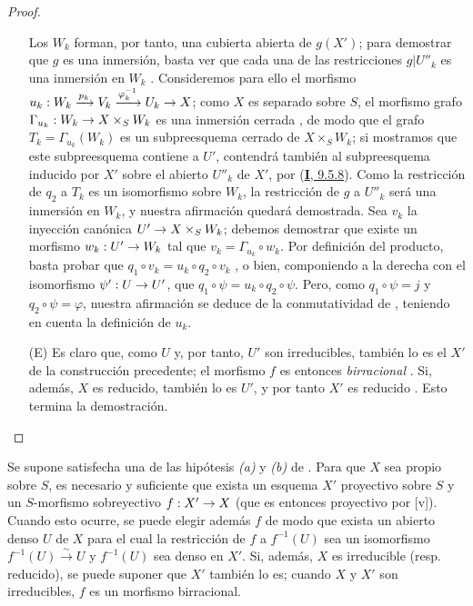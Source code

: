 \documentclass[oneside,10pt]{amsart}
\makeatletter
\newcommand{\ega@arrow}[2]{\mathchoice{#1}{#2}{#2}{#2}}
\renewcommand{\to}{\ega@arrow{\longrightarrow}{\rightarrow}}
\newcommand{\oldpage}[2][]{\marginnote{\normalfont\footnotesize\textbf{#1}~|~#2}\ignorespaces}
\let\EGAOriginalLabel\label
\renewcommand{\label}[1]{\phantomsection\EGAOriginalLabel{#1}}
\makeatother
\begin{document}
\begin{proof}
\begin{enumerate}
    Los $W_k$ forman, por tanto, una cubierta abierta de $g(X')$; para demostrar que $g$ es una inmersión, basta ver que cada una de las restricciones $g|U''_k$ es una inmersión en $W_k$ .
    Consideremos para ello el morfismo $u_k:W_k\xrightarrow{p_k}V_k\xrightarrow{\varphi_k^{-1}}U_k\to X$; como $X$ es separado sobre $S$, el morfismo grafo $\Gamma_{u_k}:W_k\to X\times_SW_k$ es una inmersión cerrada , de modo que el grafo $T_k=\Gamma_{u_k}(W_k)$ es un subpreesquema cerrado de $X\times_SW_k$;
    si mostramos que este subpreesquema contiene a $U'$, contendrá también al subpreesquema inducido por $X'$ sobre el abierto $U''_k$ de $X'$, por (\hyperref[I.9.5.8-fr]{\textbf{I}, 9.5.8}).
    Como la restricción de $q_2$ a $T_k$ es un isomorfismo sobre $W_k$, la restricción de $g$ a $U''_k$ será una inmersión en $W_k$, y nuestra afirmación quedará demostrada.
    Sea $v_k$ la inyección canónica $U'\to X\times_SW_k$; debemos demostrar que existe un morfismo $w_k:U'\to W_k$ tal que $v_k=\Gamma_{u_k}\circ w_k$.
    Por definición del producto, basta probar que $q_1\circ v_k=u_k\circ q_2\circ v_k$ , o bien, componiendo a la derecha
\oldpage[II]{109}
    con el isomorfismo $\psi':U\to U'$, que $q_1\circ\psi=u_k\circ q_2\circ\psi$.
    Pero, como $q_1\circ\psi=j$ y $q_2\circ\psi=\varphi$, nuestra afirmación se deduce de la conmutatividad de , teniendo en cuenta la definición de $u_k$.

  \item[(E)] Es claro que, como $U$ y, por tanto, $U'$ son irreducibles, también lo es el $X'$ de la construcción precedente; el morfismo $f$ es entonces \emph{birracional} .
    Si, además, $X$ es reducido, también lo es $U'$, y por tanto $X'$ es reducido .
    Esto termina la demostración.
\end{enumerate}
\end{proof}

\begin{corollary}[5.6.2]
\label{II.5.6.2-fr}
Se supone satisfecha una de las hipótesis \emph{(a)} y \emph{(b)} de .
Para que $X$ sea propio sobre $S$, es necesario y suficiente que exista un esquema $X'$ proyectivo sobre $S$ y un $S$-morfismo sobreyectivo $f:X'\to X$ (que es entonces proyectivo por [v]).
Cuando esto ocurre, se puede elegir además $f$ de modo que exista un abierto denso $U$ de $X$ para el cual la restricción de $f$ a $f^{-1}(U)$ sea un isomorfismo $f^{-1}(U)\xrightarrow{\sim}U$ y $f^{-1}(U)$ sea denso en $X'$.
Si, además, $X$ es irreducible \textup{(resp.} reducido), se puede suponer que $X'$ también lo es; cuando $X$ y $X'$ son irreducibles, $f$ es un morfismo birracional.
\end{corollary}
\end{document}
